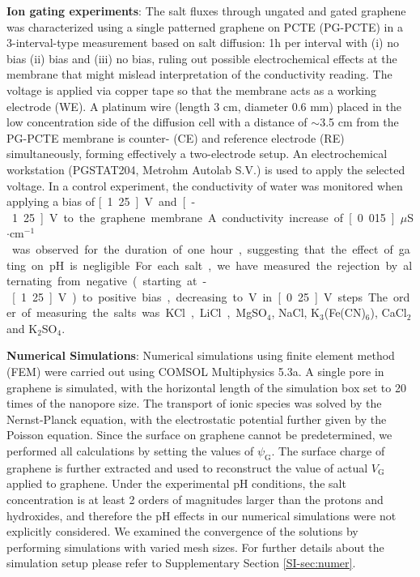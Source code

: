 \vspace{1em}
\noindent
\textbf{Ion gating experiments}: 
{ The salt fluxes through ungated and gated graphene
was characterized using a single patterned graphene on PCTE (PG-PCTE)} 
in a 3-interval-type measurement based on salt diffusion: 1h per interval
with (i) no bias (ii) bias and (iii) no bias, ruling out possible
electrochemical effects at the membrane that might mislead
interpretation of the conductivity reading. The voltage is applied via
copper tape so that the membrane acts as a working electrode (WE). A
platinum wire (length 3 cm, diameter 0.6 mm) placed in the low
concentration side of the diffusion cell with a distance of $\sim$3.5 cm
from the PG-PCTE membrane is counter- (CE) and reference electrode
(RE) simultaneously, forming effectively a two-electrode setup. An
electrochemical workstation (PGSTAT204, Metrohm Autolab S.V.) is used
to apply the selected voltage.
{ In a control experiment, the conductivity of water was monitored when applying a bias of \unit[1.25]{V} and \unit[-1.25]{V} to the graphene membrane. A conductivity increase of \unit[0.015]{$\mu$S$\cdot$cm$^{-1}$} was observed for the duration of one hour, suggesting that the effect of gating on pH is negligible.

  For each salt, we have measured the rejection by alternating from
  negative (starting at -\unit[1.25]{V}) to positive bias, decreasing
  to \unit[0]{V} in \unit[0.25]{V} steps. The order of measuring the
  salts was KCl, LiCl, MgSO$_4$, NaCl, K$_3$(Fe(CN)$_6$), CaCl$_2$ and
  K$_2$SO$_4$.}

\vspace{1em}
\noindent
\textbf{Numerical Simulations}: Numerical simulations using finite
element method (FEM) were carried out using COMSOL Multiphysics
5.3a. A single pore in graphene is simulated, with the horizontal
length of the simulation box set to 20 times of the nanopore size. The
transport of ionic species was solved by the Nernst-Planck equation,
with the electrostatic potential further given by the Poisson
equation. Since the surface on graphene cannot be predetermined, we
performed all calculations by setting the values of
$\psi_{\mathrm{G}}$. The surface charge of graphene is further
extracted and used to reconstruct the value of actual $V_{\mathrm{G}}$
applied to graphene. 
{
Under the experimental pH conditions, the salt concentration is at least 2 orders of magnitudes larger than the protons and hydroxides, and therefore the pH effects in our numerical simulations were not explicitly considered.
}
We examined the convergence of the solutions by
performing simulations with varied mesh sizes. For further details
about the simulation setup please refer to Supplementary Section
\autoref{SI-sec:numer}.



